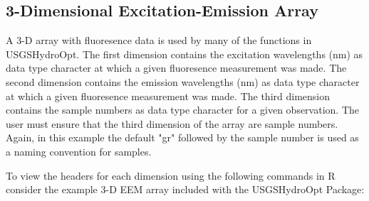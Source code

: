 \documentclass[a4paper,11pt]{article}\usepackage[]{graphicx}\usepackage[]{color}
\begin{document}
\subsection{3-Dimensional Excitation-Emission Array}
A 3-D array with fluoresence data is used by many of the functions in USGSHydroOpt. The first dimension contains the excitation wavelengths (nm) as data type character at which a given fluoresence measurement was made. The second dimension contains the emission wavelengths (nm) as data type character at which a given fluoresence measurement was made. The third dimension contains the sample numbers as data type character for a given observation. The user must ensure that the third dimension of the array are sample numbers. Again, in this example the default "gr" followed by the sample number is used as a naming convention for samples.

To view the headers for each dimension using the following commands in R consider the example 3-D EEM array included with the USGSHydroOpt Package: 
\end{document}
